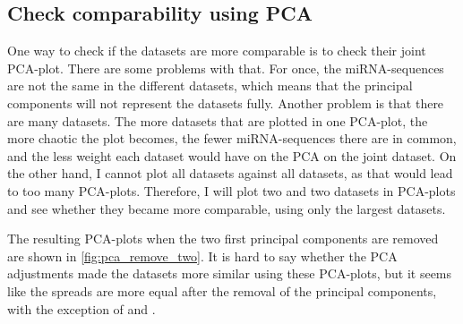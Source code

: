 {{{{{{{{{{{{\subsection{Check comparability using PCA}
One way to check if the datasets are more comparable is to check their joint PCA-plot. There are some problems with that. For once, the miRNA-sequences are not the same in the different datasets, which means that the principal components will not represent the datasets fully. Another problem is that there are many datasets. The more datasets that are plotted in one PCA-plot, the more chaotic the plot becomes, the fewer miRNA-sequences there are in common, and the less weight each dataset would have on the PCA on the joint dataset. On the other hand, I cannot plot all datasets against all datasets, as that would lead to too many PCA-plots. Therefore, I will plot two and two datasets in PCA-plots and see whether they became more comparable, using only the largest datasets.

The resulting PCA-plots when the two first principal components are removed are shown in \autoref{fig:pca_remove_two}. It is hard to say whether the PCA adjustments made the datasets more similar using these PCA-plots, but it seems like the spreads are more equal after the removal of the principal components, with the exception of \citet{Asakura2020} and \citet{Fehlmann2020}.

}}}}}}}}}}}}
